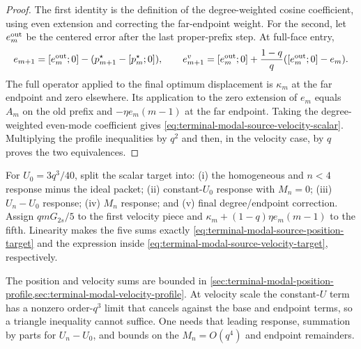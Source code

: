 \begin{proof}
The first identity is the definition of the degree-weighted cosine
coefficient, using even extension and correcting the far-endpoint weight.
For the second, let $e_m^{\rm out}$ be the centered error after the last
proper-prefix step.  At full-face entry,
\[
 e_{m+1}=[e_m^{\rm out};0]
 -(p_{m+1}^\star-[p_m^\star;0]),
 \qquad
 e_{m+1}^v=[e_m^{\rm out};0]
 +\frac{1-q}{q}([e_m^{\rm out};0]-e_m).
\]
The full operator applied to the final optimum displacement is
$\kappa_m$ at the far endpoint and zero elsewhere.  Its application to the
zero extension of $e_m$ equals $A_m$ on the old prefix and
$-\eta e_m(m-1)$ at the far endpoint.  Taking the degree-weighted even-mode
coefficient gives
\eqref{eq:terminal-modal-source-velocity-scalar}.  Multiplying the profile
inequalities by $q^2$ and then, in the velocity case, by $q$ proves the two
equivalences.
\end{proof}

For $U_0=3q^3/40$, split the scalar target into: (i) the homogeneous and
$n<4$ response minus the ideal packet; (ii) constant-$U_0$ response with
$M_n=0$; (iii) $U_n-U_0$ response; (iv) $M_n$ response; and (v) final
degree/endpoint correction.  Assign $qmG_{2s}/5$ to the first velocity piece
and $\kappa_m+(1-q)\eta e_m(m-1)$ to the fifth.  Linearity makes the five sums
exactly \eqref{eq:terminal-modal-source-position-target} and the expression
inside \eqref{eq:terminal-modal-source-velocity-target}, respectively.

The position and velocity sums are bounded in
\cref{sec:terminal-modal-position-profile,sec:terminal-modal-velocity-profile}.
At velocity scale the
constant-$U$ term has a nonzero order-$q^3$ limit that cancels against the
base and endpoint terms, so a triangle inequality cannot suffice.  One needs
that leading response, summation by parts for $U_n-U_0$, and bounds on the
$M_n=O(q^4)$ and endpoint remainders.
